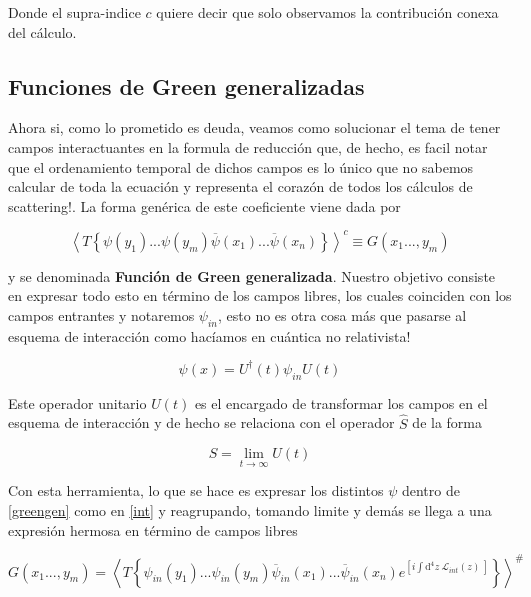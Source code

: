 \documentclass{article}
\numberwithin{equation}{section}
\begin{document}
Donde el supra-indice $ c $ quiere decir que solo observamos la contribución
conexa del cálculo. 

\subsection{Funciones de Green generalizadas}\label{sec_green}

Ahora si, como lo prometido es deuda, veamos como solucionar el tema de tener campos interactuantes en la formula de reducción que, de hecho, es facil notar que el ordenamiento temporal de dichos campos es lo único que no sabemos calcular de toda la ecuación y representa el corazón de todos los cálculos de scattering!. La forma genérica de este coeficiente viene dada por

\begin{equation}\label{greengen}
\left\langle T\left\{ \psi(y_{1})...\psi(y_{m})\overline{\psi}(x_{1})...\overline{\psi}(x_{n})\right\} \right\rangle ^{c}\equiv G(x_{1}...,y_{m})
\end{equation}

y se denominada \textbf{Función de Green generalizada}. Nuestro objetivo consiste en expresar todo esto en término de los campos libres,
los cuales coinciden con los campos entrantes y notaremos $\psi_{in}$, esto no es otra cosa más que pasarse al esquema de interacción como
hacíamos en cuántica no relativista!

\begin{equation}\label{int}
\psi(x)=U^{\dagger}(t)\psi_{in}U(t)
\end{equation}

Este operador unitario $ U(t) $ es el encargado de transformar los campos en el esquema de interacción y de hecho se relaciona con el operador $ \hat{S}$ de la forma 

\begin{equation}\label{key}
S=\lim_{t\rightarrow \infty} U(t)
\end{equation}

Con esta herramienta, lo que se hace es expresar los distintos $ \psi $ dentro de \ref{greengen}  como en \ref{int}  y reagrupando, tomando limite y demás se llega a una expresión hermosa en término de campos libres

\begin{equation}\label{green_generalizado}
G(x_{1}...,y_{m})=\left\langle T\left\{ \psi_{in}(y_{1})...\psi_{in}(y_{m})\overline{\psi}_{in}(x_{1})...\overline{\psi}_{in}(x_{n})e^{\left[i\int \mathrm{d^4}z \ \mathcal{L}_{int}(z) \ \right]}\right\} \right\rangle ^{\#}
\end{equation}
\end{document}
